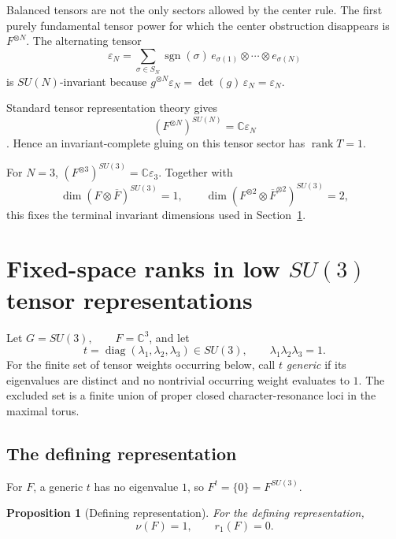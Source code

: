 \documentclass[11pt]{article}
\theoremstyle{plain}
\newtheorem{proposition}[theorem]{Proposition}
\theoremstyle{definition}
\begin{document}
Balanced tensors are not the only sectors allowed by the center rule. The
first purely fundamental tensor power for which the center obstruction
disappears is
\(F^{\otimes N}\).
The alternating tensor
\begin{equation}
\label{eq:epsilon-general}
\varepsilon_N
=
\sum_{\sigma\in S_N}
\operatorname{sgn}(\sigma)\,
e_{\sigma(1)}\otimes\cdots\otimes e_{\sigma(N)}
\end{equation}
is \(SU(N)\)-invariant because
\(g^{\otimes N}\varepsilon_N = \det(g)\,\varepsilon_N = \varepsilon_N\).

Standard tensor representation theory gives
\begin{equation}
\label{eq:determinant-invariant-space}
\left(F^{\otimes N}\right)^{SU(N)}
=
\mathbb C\varepsilon_N
\end{equation}
\citep{FultonHarris1991,GoodmanWallach2009}. Hence an invariant-complete
gluing on this tensor sector has
\(\operatorname{rank}T=1\).

For \(N=3\),
\((F^{\otimes3})^{SU(3)}=\mathbb C\varepsilon_3\).
Together with
\[
\dim(F\otimes\overline F)^{SU(3)}=1,
\qquad
\dim\left(F^{\otimes2}\otimes\overline F^{\otimes2}\right)^{SU(3)}=2,
\]
this fixes the terminal invariant dimensions used in Section~\ref{sec:SU3-fixed-spaces}.


\section{Fixed-space ranks in low \texorpdfstring{\(SU(3)\)}{SU(3)} tensor representations}
\label{sec:SU3-fixed-spaces}

Let
\(G=SU(3), \qquad F=\mathbb C^3\),
and let
\[
t=\operatorname{diag}(\lambda_1,\lambda_2,\lambda_3)\in SU(3),
\qquad
\lambda_1\lambda_2\lambda_3=1.
\]
For the finite set of tensor weights occurring below, call \(t\) \emph{generic} if its eigenvalues are distinct and no nontrivial occurring weight evaluates to \(1\). The excluded set is a finite union of proper closed character-resonance loci in the maximal torus.

\subsection{The defining representation}

For \(F\), a generic \(t\) has no eigenvalue \(1\), so
\(F^t=\{0\}=F^{SU(3)}\).

\begin{proposition}[Defining representation]
\label{prop:SU3-fundamental-completion}
For the defining representation,
\[
\nu(F)=1,
\qquad
r_1(F)=0.
\]
\end{proposition}
\end{document}
